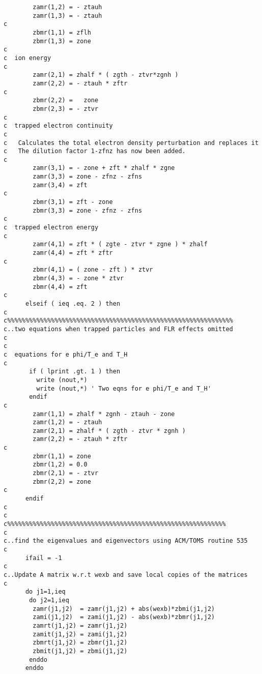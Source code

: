 \begin{verbatim}
        zamr(1,2) = - ztauh
        zamr(1,3) = - ztauh
c
        zbmr(1,1) = zflh
        zbmr(1,3) = zone
c
c  ion energy
c
        zamr(2,1) = zhalf * ( zgth - ztvr*zgnh )
        zamr(2,2) = - ztauh * zftr
c
        zbmr(2,2) =   zone
        zbmr(2,3) = - ztvr
c
c  trapped electron continuity
c
c   Calculates the total electron density perturbation and replaces it
c   The dilution factor 1-zfnz has now been added.
c
        zamr(3,1) = - zone + zft * zhalf * zgne
        zamr(3,3) = zone - zfnz - zfns
        zamr(3,4) = zft
c
        zbmr(3,1) = zft - zone
        zbmr(3,3) = zone - zfnz - zfns
c
c  trapped electron energy
c
        zamr(4,1) = zft * ( zgte - ztvr * zgne ) * zhalf
        zamr(4,4) = zft * zftr
c
        zbmr(4,1) = ( zone - zft ) * ztvr
        zbmr(4,3) = - zone * ztvr
        zbmr(4,4) = zft
c
      elseif ( ieq .eq. 2 ) then
c
c%%%%%%%%%%%%%%%%%%%%%%%%%%%%%%%%%%%%%%%%%%%%%%%%%%%%%%%%%%%%%%
c..two equations when trapped particles and FLR effects omitted
c
c
c  equations for e phi/T_e and T_H
c
       if ( lprint .gt. 1 ) then
         write (nout,*)
         write (nout,*) ' Two eqns for e phi/T_e and T_H'
       endif
c
        zamr(1,1) = zhalf * zgnh - ztauh - zone
        zamr(1,2) = - ztauh
        zamr(2,1) = zhalf * ( zgth - ztvr * zgnh )
        zamr(2,2) = - ztauh * zftr
c
        zbmr(1,1) = zone
        zbmr(1,2) = 0.0
        zbmr(2,1) = - ztvr
        zbmr(2,2) = zone
c
      endif
c
c
c%%%%%%%%%%%%%%%%%%%%%%%%%%%%%%%%%%%%%%%%%%%%%%%%%%%%%%%%%%%%
c
c..find the eigenvalues and eigenvectors using ACM/TOMS routine 535
c
      ifail = -1
c
c..Update A matrix w.r.t wexb and save local copies of the matrices
c
      do j1=1,ieq
       do j2=1,ieq
        zamr(j1,j2)  = zamr(j1,j2) + abs(wexb)*zbmi(j1,j2)
        zami(j1,j2)  = zami(j1,j2) - abs(wexb)*zbmr(j1,j2)
        zamrt(j1,j2) = zamr(j1,j2) 
        zamit(j1,j2) = zami(j1,j2) 
        zbmrt(j1,j2) = zbmr(j1,j2) 
        zbmit(j1,j2) = zbmi(j1,j2) 
       enddo
      enddo


\end{verbatim}
